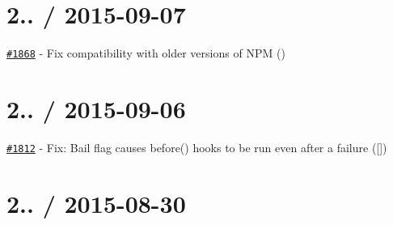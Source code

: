 \section*{2.. / 2015-\/09-\/07}


\begin{DoxyItemize}
\item \href{https://github.com/mochajs/mocha/issues/1868}{\tt \#1868} -\/ Fix compatibility with older versions of N\+PM (\href{https://github.com/boneskull}{\tt })
\end{DoxyItemize}

\section*{2.. / 2015-\/09-\/06}


\begin{DoxyItemize}
\item \href{https://github.com/mochajs/mocha/issues/1812}{\tt \#1812} -\/ Fix\+: Bail flag causes before() hooks to be run even after a failure (\mbox{[}\mbox{]})
\end{DoxyItemize}

\section*{2.. / 2015-\/08-\/30}


